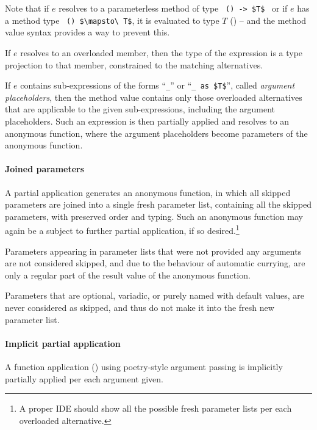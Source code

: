 Note that if $e$ resolves to a parameterless method of type ~\lstinline!() -> $T$!~ or if $e$ has a method type ~\lstinline!() $\mapsto\ T$!, it is evaluated to type $T$ () -- and the method value syntax provides a way to prevent this. 

If $e$ resolves to an overloaded member, then the type of the expression is a type projection to that member, constrained to the matching alternatives. 

If $e$ contains sub-expressions of the forms ``\lstinline!_!'' or ``\lstinline!_ as $T$!'', called {\em argument placeholders}, then the method value contains only those overloaded alternatives that are applicable to the given sub-expressions, including the argument placeholders. Such an expression is then partially applied and resolves to an anonymous function, where the argument placeholders become parameters of the anonymous function. 

\paragraph{Joined parameters}

A partial application generates an anonymous function, in which all skipped parameters are joined into a single fresh parameter list, containing all the skipped parameters, with preserved order and typing. Such an anonymous function may again be a subject to further partial application, if so desired.\footnote{A proper IDE should show all the possible fresh parameter lists per each overloaded alternative.} 

Parameters appearing in parameter lists that were not provided any arguments are not considered skipped, and due to the behaviour of automatic currying, are only a regular part of the result value of the anonymous function. 

Parameters that are optional, variadic, or purely named with default values, are never considered as skipped, and thus do not make it into the fresh new parameter list. 

\paragraph{Implicit partial application}

A function application () using poetry-style argument passing is implicitly partially applied per each argument given. 

